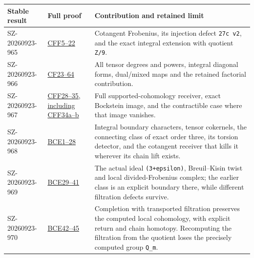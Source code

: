 \documentclass[
]{article}
\newcounter{none} %
\begin{document}
{\def\LTcaptype{none} %
\begin{longtable}[]{@{}
  >{\raggedright\arraybackslash}p{}
  >{\raggedright\arraybackslash}p{}
  >{\raggedright\arraybackslash}p{}@{}}
\toprule\noalign{}
\begin{minipage}[b]{\linewidth}\raggedright
Stable result
\end{minipage} & \begin{minipage}[b]{\linewidth}\raggedright
Full proof
\end{minipage} & \begin{minipage}[b]{\linewidth}\raggedright
Contribution and retained limit
\end{minipage} \\
\midrule\noalign{}
\endhead
\bottomrule\noalign{}
\endlastfoot
SZ-20260923-965 &
\href{collision_boundary/original_sources/COLLISION_FROBENIUS_FILTRATION_AND_SUPPORT.tex}{CFF5--22}
& Cotangent Frobenius, its injection defect \texttt{27c\ v2}, and the
exact integral extension with quotient \texttt{Z/9}. \\
SZ-20260923-966 &
\href{collision_boundary/original_sources/COLLISION_FILTRATION_APPENDIX.tex}{CF23--64}
& All tensor degrees and powers, integral diagonal forms, dual/mixed
maps and the retained factorial contribution. \\
SZ-20260923-967 &
\href{collision_boundary/original_sources/COLLISION_FROBENIUS_FILTRATION_AND_SUPPORT.tex}{CFF28--35,
including CFF34a--b} & Full supported-cohomology receiver, exact
Bockstein image, and the contractible case where that image vanishes. \\
SZ-20260923-968 &
\href{MIXED_BOUNDARY_COLLISION_EXTENSION.tex}{BCE1--28} & Integral
boundary characters, tensor cokernels, the connecting class of exact
order three, its torsion detector, and the cotangent receiver that kills
it wherever its chain lift exists. \\
SZ-20260923-969 &
\href{MIXED_BOUNDARY_COLLISION_EXTENSION.tex}{BCE29--41} & The actual
ideal \texttt{(3+epsilon)}, Breuil--Kisin twist and local
divided-Frobenius complex; the earlier class is an explicit boundary
there, while different filtration defects survive. \\
SZ-20260923-970 &
\href{MIXED_BOUNDARY_COLLISION_EXTENSION.tex}{BCE42--45} & Completion
with transported filtration preserves the computed local cohomology,
with explicit return and chain homotopy. Recomputing the filtration from
the quotient loses the precisely computed group \texttt{Q\_m}. \\
\end{longtable}
}
\end{document}
